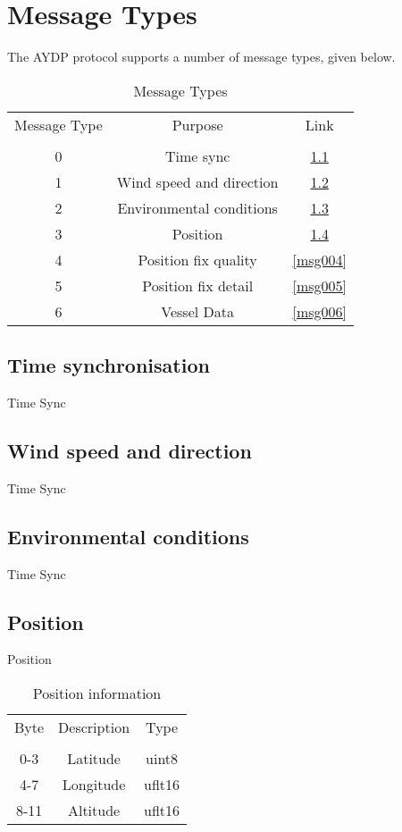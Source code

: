 \chapter{Message Types}
The AYDP protocol supports a number of message types, given below.

\begin{table}[H]
  \centering
  \begin{tabular}{ c c c }
  Message Type & Purpose & Link\\
               &         &              \\
\hline
   0 & Time sync                & \ref{msg000} \\
   1 & Wind speed and direction & \ref{msg001} \\
   2 & Environmental conditions & \ref{msg002} \\
   3 & Position                 & \ref{msg003} \\
   4 & Position fix quality     & \ref{msg004} \\
   5 & Position fix detail      & \ref{msg005} \\
   6 & Vessel Data              & \ref{msg006} \\
  \end{tabular}
  \caption{Message Types}
  \label{table:msg:types}
\end{table}

\section{Time synchronisation}
\label{msg000}
Time Sync

\section{Wind speed and direction}
\label{msg001}
Time Sync

\section{Environmental conditions}
\label{msg002}
Time Sync

\section{Position}
\label{msg003}
Position
\begin{table}[H]
  \centering
  \begin{tabular}{ c c c }
  Byte & Description & Type \\
              &      &              \\
\hline
   0-3  & Latitude  & uint8  \\
   4-7  & Longitude & uflt16 \\
   8-11 & Altitude  & uflt16 \\
  \end{tabular}
  \caption{Position information}
\end{table}

